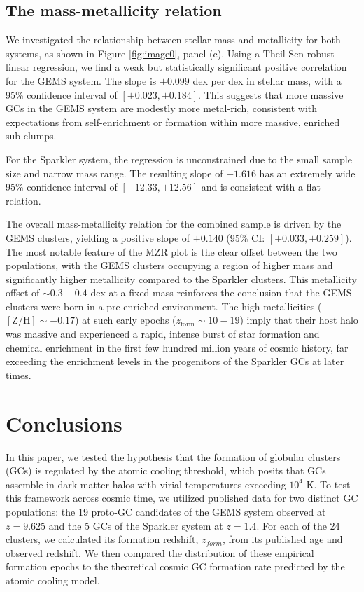 \documentclass[]{article}
\begin{document}
\subsection{The mass-metallicity relation}

We investigated the relationship between stellar mass and metallicity for both systems, as shown in Figure \ref{fig:image0}, panel (c). Using a Theil-Sen robust linear regression, we find a weak but statistically significant positive correlation for the GEMS system. The slope is $+0.099$ dex per dex in stellar mass, with a 95\% confidence interval of $[+0.023, +0.184]$. This suggests that more massive GCs in the GEMS system are modestly more metal-rich, consistent with expectations from self-enrichment or formation within more massive, enriched sub-clumps.

For the Sparkler system, the regression is unconstrained due to the small sample size and narrow mass range. The resulting slope of $-1.616$ has an extremely wide 95\% confidence interval of $[-12.33, +12.56]$ and is consistent with a flat relation.

The overall mass-metallicity relation for the combined sample is driven by the GEMS clusters, yielding a positive slope of $+0.140$ (95\% CI: $[+0.033, +0.259]$). The most notable feature of the MZR plot is the clear offset between the two populations, with the GEMS clusters occupying a region of higher mass and significantly higher metallicity compared to the Sparkler clusters. This metallicity offset of $\sim 0.3-0.4$ dex at a fixed mass reinforces the conclusion that the GEMS clusters were born in a pre-enriched environment. The high metallicities ($[\mathrm{Z/H}] \sim -0.17$) at such early epochs ($z_\mathrm{form} \sim 10-19$) imply that their host halo was massive and experienced a rapid, intense burst of star formation and chemical enrichment in the first few hundred million years of cosmic history, far exceeding the enrichment levels in the progenitors of the Sparkler GCs at later times.

\section{Conclusions}
\label{sec:conclusions}


In this paper, we tested the hypothesis that the formation of globular clusters (GCs) is regulated by the atomic cooling threshold, which posits that GCs assemble in dark matter halos with virial temperatures exceeding $10^4$ K. To test this framework across cosmic time, we utilized published data for two distinct GC populations: the 19 proto-GC candidates of the GEMS system observed at $z=9.625$ and the 5 GCs of the Sparkler system at $z=1.4$. For each of the 24 clusters, we calculated its formation redshift, $z_{form}$, from its published age and observed redshift. We then compared the distribution of these empirical formation epochs to the theoretical cosmic GC formation rate predicted by the atomic cooling model.
\end{document}
